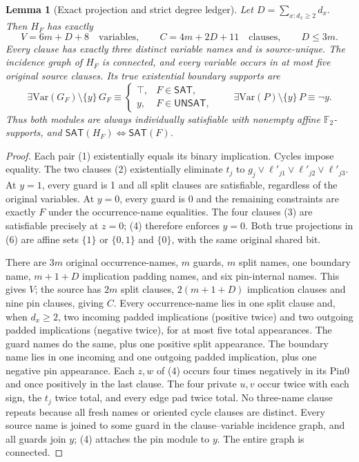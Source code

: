 \documentclass[11pt]{article}
\newtheorem{lemma}[theorem]{Lemma}
\newcommand{\SAT}{\mathsf{SAT}}
\newcommand{\UNSAT}{\mathsf{UNSAT}}
\begin{document}
\begin{lemma}[Exact projection and strict degree ledger]\label{lem:degree}
Let $D=\sum_{x:d_x\ge2}d_x$. Then $H_F$ has exactly
\[
 V=6m+D+8\quad\text{variables},\qquad C=4m+2D+11\quad\text{clauses},\qquad D\le3m.\tag{5}
\]
Every clause has exactly three distinct variable names and is source-unique. The incidence graph of $H_F$ is connected, and every variable occurs in at most five original source clauses. Its true existential boundary supports are
\[
 \exists\mathrm{Var}(G_F)\setminus\{y\}\,G_F\equiv
 \begin{cases}\top,&F\in\SAT,\\ y,&F\in\UNSAT,\end{cases}
 \qquad \exists\mathrm{Var}(P)\setminus\{y\}\,P\equiv\neg y.\tag{6}
\]
Thus both modules are always individually satisfiable with nonempty affine $\mathbb F_2$-supports, and $\SAT(H_F)\iff\SAT(F)$.
\end{lemma}
\begin{proof}
Each pair (1) existentially equals its binary implication. Cycles impose equality. The two clauses (2) existentially eliminate $t_j$ to $g_j\vee\ell'_{j1}\vee\ell'_{j2}\vee\ell'_{j3}$. At $y=1$, every guard is 1 and all split clauses are satisfiable, regardless of the original variables. At $y=0$, every guard is 0 and the remaining constraints are exactly $F$ under the occurrence-name equalities. The four clauses (3) are satisfiable precisely at $z=0$; (4) therefore enforces $y=0$. Both true projections in (6) are affine sets $\{1\}$ or $\{0,1\}$ and $\{0\}$, with the same original shared bit.

There are $3m$ original occurrence-names, $m$ guards, $m$ split names, one boundary name, $m+1+D$ implication padding names, and six pin-internal names. This gives $V$; the source has $2m$ split clauses, $2(m+1+D)$ implication clauses and nine pin clauses, giving $C$. Every occurrence-name lies in one split clause and, when $d_x\ge2$, two incoming padded implications (positive twice) and two outgoing padded implications (negative twice), for at most five total appearances. The guard names do the same, plus one positive split appearance. The boundary name lies in one incoming and one outgoing padded implication, plus one negative pin appearance. Each $z,w$ of (4) occurs four times negatively in its Pin0 and once positively in the last clause. The four private $u,v$ occur twice with each sign, the $t_j$ twice total, and every edge pad twice total. No three-name clause repeats because all fresh names or oriented cycle clauses are distinct. Every source name is joined to some guard in the clause--variable incidence graph, and all guards join $y$; (4) attaches the pin module to $y$. The entire graph is connected.
\end{proof}
\end{document}
